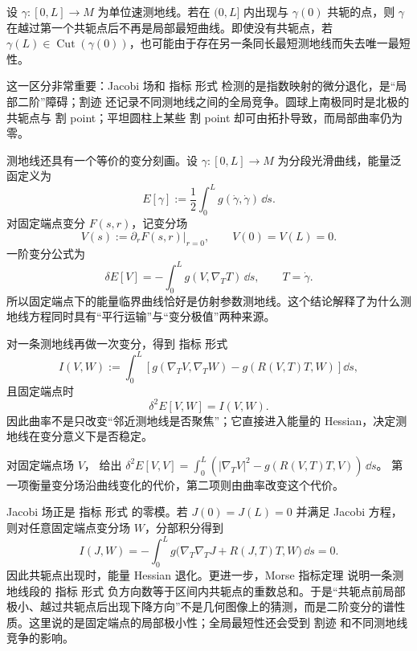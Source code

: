 \begin{theorem}\label{thm:math-dg-minimizing-cut-conjugate}
设 $\gamma:[0,L]\to M$ 为单位速测地线。若在 $(0,L]$ 内出现与 $\gamma(0)$ 共轭的点，则 $\gamma$ 在越过第一个共轭点后不再是局部最短曲线。即使没有共轭点，若 $\gamma(L)\in\operatorname{Cut}(\gamma(0))$，也可能由于存在另一条同长最短测地线而失去唯一最短性。
\end{theorem}

这一区分非常重要：Jacobi 场和 指标 形式 检测的是指数映射的微分退化，是“局部二阶”障碍；割迹 还记录不同测地线之间的全局竞争。圆球上南极同时是北极的共轭点与 割 point；平坦圆柱上某些 割 point 却可由拓扑导致，而局部曲率仍为零。

测地线还具有一个等价的变分刻画。设 $\gamma:[0,L]\to M$ 为分段光滑曲线，能量泛函定义为
\begin{equation*}E[\gamma]
:=\frac12\int_0^L g(\dot\gamma,\dot\gamma)\,\dd s.\end{equation*}
对固定端点变分 $F(s,r)$，记变分场
\[
V(s):=\partial_rF(s,r)|_{r=0},
\qquad V(0)=V(L)=0.
\]
一阶变分公式为
\begin{equation}
\delta E[V]
=-\int_0^L g(V,\nabla_TT)\,\dd s,
\qquad T=\dot\gamma.
\label{eq:math-dg-energy-first-variation}
\end{equation}
所以固定端点下的能量临界曲线恰好是仿射参数测地线。这个结论解释了为什么测地线方程同时具有“平行运输”与“变分极值”两种来源。

对一条测地线再做一次变分，得到 指标 形式
\begin{equation}
I(V,W)
:=\int_0^L
\left[
 g(\nabla_TV,\nabla_TW)
 -g(R(V,T)T,W)
\right]\dd s,
\label{eq:math-dg-index-form}
\end{equation}
且固定端点时
\[
\delta^2E[V,W]=I(V,W).
\]
因此曲率不是只改变“邻近测地线是否聚焦”；它直接进入能量的 Hessian，决定测地线在变分意义下是否稳定。

对固定端点场 $V$， 给出
$\delta^2E[V,V]=\int_0^L(|\nabla_TV|^2-g(R(V,T)T,V))\,\dd s$。
第一项衡量变分场沿曲线变化的代价，第二项则由曲率改变这个代价。

Jacobi 场正是 指标 形式 的零模。若 $J(0)=J(L)=0$ 并满足 Jacobi 方程，则对任意固定端点变分场 $W$，分部积分得到
\[
I(J,W)
=-\int_0^L
 g\bigl(\nabla_T\nabla_TJ+R(J,T)T,W\bigr)\,\dd s=0.
\]
因此共轭点出现时，能量 Hessian 退化。更进一步，Morse 指标定理 说明一条测地线段的 指标 形式 负方向数等于区间内共轭点的重数总和。于是“共轭点前局部极小、越过共轭点后出现下降方向”不是几何图像上的猜测，而是二阶变分的谱性质。这里说的是固定端点的局部极小性；全局最短性还会受到 割迹 和不同测地线竞争的影响。

